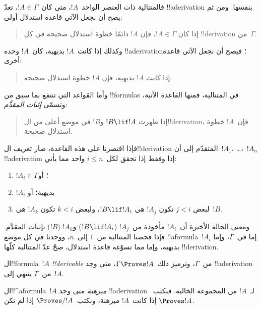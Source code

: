 \documentclass[../../../include/open-logic-section]{subfiles}
\begin{document}
فالمتتالية ذات العنصر الواحد~$!A$، متى كان~$!A \in \Gamma$،
تعدّ !!a{derivation} بنفسها. ومن ثم يصح أن نجعل الآتي
قاعدة استدلال أولى:
\begin{quote}
  إذا كان $!A \in \Gamma$، فإن $!A$ دائمًا خطوة استدلال صحيحة في كل
  !!{derivation} من~$\Gamma$.
\end{quote}
وكذلك إذا كانت~$!A$ بديهية، كان~$!A$ وحده !!a{derivation}؛
فيصح أن نجعل الآتي قاعدة أخرى:
\begin{quote}
  إذا كانت $!A$ بديهية، فإن $!A$ خطوة استدلال صحيحة.
\end{quote}
وأما القواعد التي تنتفع بما سبق من !!{formula}s في المتتالية،
فمنها القاعدة الآتية، وتسمّى \emph{إثبات المقدَّم}:
\begin{quote}
  إذا ظهرت $!B \lif !A$ و$!B$ في موضع أعلى من ال!!{derivation}،
  فإن~$!A$ خطوة استدلال صحيحة.
\end{quote}
فإذا اقتصرنا على هذه القاعدة، صار تعريف ال!!{derivation}
المتقدّم إلى أن~$!A_1$، \dots،~$!A_n$ !!a{derivation}
إذا وفقط إذا تحقق لكل~$i \le n$ واحد مما يأتي:
\begin{enumerate}
\item $!A_i \in \Gamma$؛ أو
\item $!A_i$ بديهية؛ أو
\item لبعض $j < i$ تكون $!A_j$ هي $!B \lif !A_i$، ولبعض $k < i$ تكون
  $!A_k$ هي~$!B$.
\end{enumerate}
ومعنى الحالة الأخيرة أن~$!A_i$ مأخوذة من~$!A_j$
($!B \lif !A_i$) و$!A_k$ ($!B$) بإثبات المقدَّم.
فإذا فحصنا المتتالية من~$1$ إلى~$n$، ووجدنا في كل موضع
!!a{formula}~$!A_i$ إما في~$\Gamma$، وإما بديهية، وإما مما
تسوّغه قاعدة استدلال، صحّ عدّ المتتالية كلّها !!{derivation}.


\begin{defn}[!!^{derivability}]
ال!!{formula}~$!A$ \emph{!!{derivable}} من~$\Gamma$،
وترميز ذلك~$\Gamma \Proves !A$، متى وجد !!a{derivation}
من~$\Gamma$ ينتهي إلى~$!A$.
\end{defn}

\begin{defn}[المبرهنات]
ال!!^a{formula}~$!A$ \emph{مبرهنة} متى وجد !!a{derivation}
لـ~$!A$ من المجموعة الخالية. فنكتب~$\Proves !A$ إذا كانت~$!A$
مبرهنة، ونكتب~$\Proves/ !A$ إذا لم تكن.
\end{defn}
\end{document}

